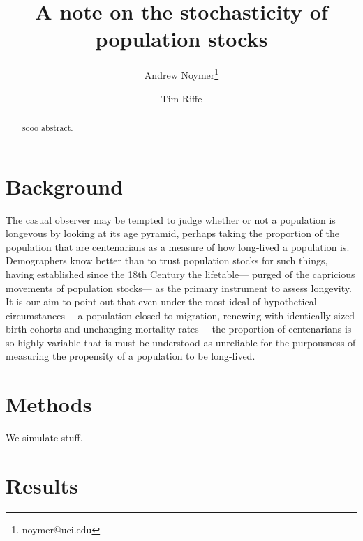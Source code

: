 \documentclass[12pt,oneside,a4paper]{article} %
\theoremstyle{definition}
\begin{document}
\title{A note on the stochasticity of population stocks}
\author[1]{Andrew Noymer\thanks{noymer@uci.edu}}
\author[2]{Tim Riffe}




\maketitle

\begin{abstract}
sooo abstract.
\end{abstract}

\section{Background}
The casual observer may be tempted to judge whether or not a population is
longevous by looking at its age pyramid, perhaps taking the proportion of
the population that are centenarians as a measure of how long-lived a population
is. Demographers know better than to trust population stocks for such things,
having established since the 18th Century \citep{graunt1939natural} the
lifetable--- purged of the capricious movements of population stocks--- as the primary instrument to assess
longevity. It is our aim to point out that even under the most ideal of
hypothetical circumstances ---a population closed to migration, renewing with
identically-sized birth cohorts and unchanging mortality rates--- the proportion
of centenarians is so highly variable that is must be understood as unreliable
for the purpousness of measuring the propensity of a population to be
long-lived.

\section{Methods}

We simulate stuff.

\section{Results}
\end{document}
